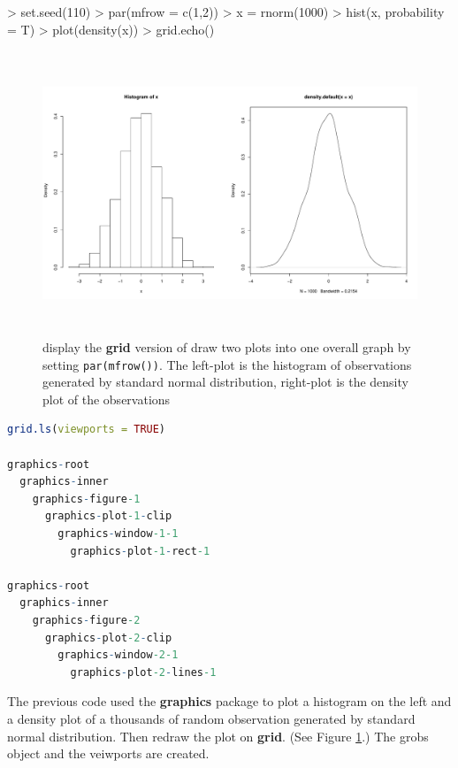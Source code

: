 \documentclass[paper=a4, fontsize=11pt]{report}
\begin{document}
\begin{Schunk}
\begin{Sinput}
> set.seed(110)
> par(mfrow = c(1,2))
> x = rnorm(1000)
> hist(x, probability = T)
> plot(density(x))
> grid.echo()
\end{Sinput}
\end{Schunk}
\begin{figure}[h]
	\begin{center}
		\includegraphics[height = 8.5cm, width = 15cm]{figure/viewport_demo_1.pdf}
		\caption{display the \textbf{grid} version of draw two plots into one overall graph by setting \texttt{par(mfrow())}. The left-plot is the histogram of observations generated by standard normal distribution, right-plot is the density plot of the observations}
		\label{figure_4.1}
	\end{center}
\end{figure}

\begin{lstlisting}[language = R]
grid.ls(viewports = TRUE)

graphics-root
  graphics-inner
    graphics-figure-1
      graphics-plot-1-clip
        graphics-window-1-1
          graphics-plot-1-rect-1

graphics-root
  graphics-inner
    graphics-figure-2
      graphics-plot-2-clip
        graphics-window-2-1
          graphics-plot-2-lines-1


\end{lstlisting}
The previous code used the \textbf{graphics} package to plot a histogram on the left and a density plot of a  thousands of random observation generated by standard normal distribution. Then redraw the plot on \textbf{grid}. (See Figure \ref{figure_4.1}.) The grobs object and the veiwports are created. \\
\end{document}
